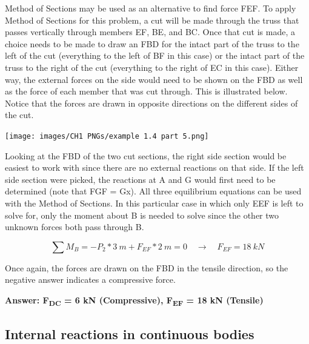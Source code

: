 \documentclass[
  letterpaper,
  DIV=11,
  numbers=noendperiod]{scrreprt}
\theoremstyle{definition}
\theoremstyle{remark}
\begin{document}
\begin{tcolorbox}
\begin{tcolorbox}
Method of Sections may be used as an alternative to find force FEF. To
apply Method of Sections for this problem, a cut will be made through
the truss that passes vertically through members EF, BE, and BC. Once
that cut is made, a choice needs to be made to draw an FBD for the
intact part of the truss to the left of the cut (everything to the left
of BF in this case) or the intact part of the truss to the right of the
cut (everything to the right of EC in this case). Either way, the
external forces on the side would need to be shown on the FBD as well as
the force of each member that was cut through. This is illustrated
below. Notice that the forces are drawn in opposite directions on the
different sides of the cut.

\begin{center}
\texttt{[image: images/CH1 PNGs/example 1.4 part 5.png]}
\end{center}

Looking at the FBD of the two cut sections, the right side section would
be easiest to work with since there are no external reactions on that
side. If the left side section were picked, the reactions at A and G
would first need to be determined (note that FGF = Gx). All three
equilibrium equations can be used with the Method of Sections. In this
particular case in which only EEF is left to solve for, only the moment
about B is needed to solve since the other two unknown forces both pass
through B.

\[
\sum M_B=-P_2*3{~m}+F_{E F}*2{~m}=0 \quad\rightarrow\quad F_{E F}=18{~kN}
\]

Once again, the forces are drawn on the FBD in the tensile direction, so
the negative answer indicates a compressive force.

\textbf{Answer: F\textsubscript{DC} = 6 kN (Compressive),
F\textsubscript{EF} = 18 kN (Tensile)}

\end{tcolorbox}

\end{tcolorbox}

\subsection{Internal reactions in continuous
bodies}\label{internal-reactions-in-continuous-bodies}
\end{document}
